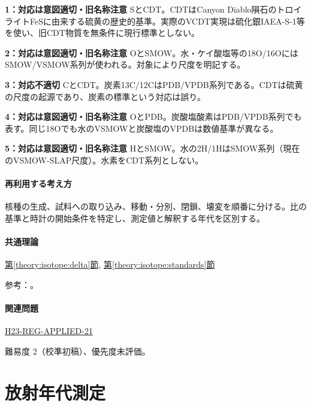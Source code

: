 \noindent\textbf{1：対応は意図適切・旧名称注意} SとCDT。CDTはCanyon Diablo隕石のトロイライトFeSに由来する硫黄の歴史的基準。実際のVCDT実現は硫化銀IAEA-S-1等を使い、旧CDT物質を無条件に現行標準としない。\par

\noindent\textbf{2：対応は意図適切・旧名称注意} OとSMOW。水・ケイ酸塩等の18O/16OにはSMOW/VSMOW系列が使われる。対象により尺度を明記する。\par

\noindent\textbf{3：対応不適切} CとCDT。炭素13C/12CはPDB/VPDB系列である。CDTは硫黄の尺度の起源であり、炭素の標準という対応は誤り。\par

\noindent\textbf{4：対応は意図適切・旧名称注意} OとPDB。炭酸塩酸素はPDB/VPDB系列でも表す。同じ18Oでも水のVSMOWと炭酸塩のVPDBは数値基準が異なる。\par

\noindent\textbf{5：対応は意図適切・旧名称注意} HとSMOW。水の2H/1HはSMOW系列（現在のVSMOW-SLAP尺度）。水素をCDT系列としない。\par

\paragraph{再利用する考え方} 核種の生成、試料への取り込み、移動・分別、閉鎖、壊変を順番に分ける。比の基準と時計の開始条件を特定し、測定値と解釈する年代を区別する。

\paragraph{共通理論} \hyperref[theory:isotope:delta]{第\ref*{theory:isotope:delta}節}, \hyperref[theory:isotope:standards]{第\ref*{theory:isotope:standards}節}

\par 参考：\cite{iso_standards1995,iso_vsmow2,iso_vcdt}。

\paragraph{関連問題} \hyperref[q:h23-reg-applied-21]{H23-REG-APPLIED-21}

\par 難易度 2（校準初稿）、優先度未評価。

\section{放射年代測定}

